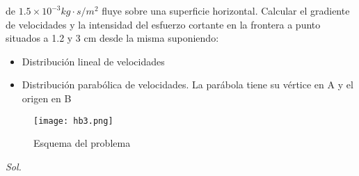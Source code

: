\begin{problem}
    de $1.5\times 10^{-3} kg\cdot s/m^2$ fluye sobre una superficie horizontal. Calcular el gradiente de velocidades y la intensidad del esfuerzo cortante en la frontera  a punto situados a 1.2 y 3 cm desde la misma suponiendo:
    \begin{itemize}
        \item Distribución lineal de velocidades
        \item Distribución parabólica de velocidades. La parábola tiene su vértice en A y el origen en B
    \end{itemize}
\end{problem}

\begin{figure}[h!]
    \centerline{\texttt{[image: hb3.png]}}
    \caption{Esquema del problema}
    \label{hb3}
  \end{figure}

\textit{ Sol. }

